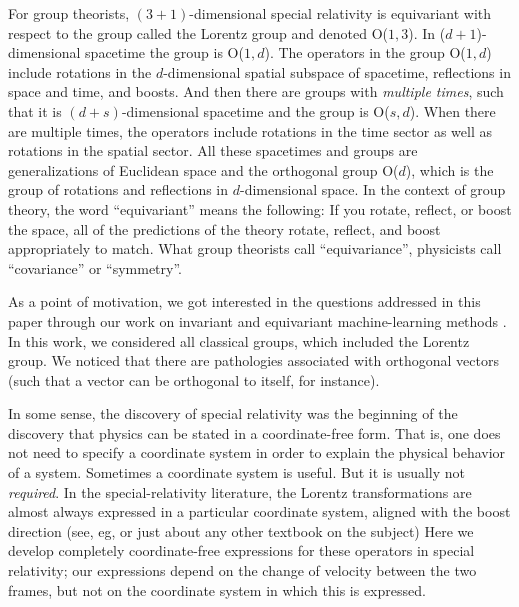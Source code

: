 \documentclass{article}
\newcommand{\plus}{\!+\!} %
\begin{document}
For group theorists, $(3\plus1)$-dimensional special relativity is equivariant with respect to the group called the Lorentz group and denoted O($1,3$).
In ($d\plus1$)-dimensional spacetime the group is O($1,d$).
The operators in the group O($1,d$) include rotations in the $d$-dimensional spatial subspace of spacetime, reflections in space and time, and boosts.
And then there are groups with \emph{multiple times}, such that it is $(d\plus s)$-dimensional spacetime and the group is O($s,d$).
When there are multiple times, the operators include rotations in the time sector as well as rotations in the spatial sector.
All these spacetimes and groups are generalizations of Euclidean space and the orthogonal group O($d$), which is the group of rotations and reflections in $d$-dimensional space.
In the context of group theory, the word ``equivariant'' means the following:
If you rotate, reflect, or boost the space, all of the predictions of the theory rotate, reflect, and boost appropriately to match.
What group theorists call ``equivariance'', physicists call ``covariance'' or ``symmetry''.

As a point of motivation, we got interested in the questions addressed in this paper through our work on invariant and equivariant machine-learning methods \cite{scalars}.
In this work, we considered all classical groups, which included the Lorentz group.
We noticed that there are pathologies associated with orthogonal vectors (such that a vector can be orthogonal to itself, for instance).

In some sense, the discovery of special relativity was the beginning of the discovery that physics can be stated in a coordinate-free form.
That is, one does not need to specify a coordinate system in order to explain the physical behavior of a system.
Sometimes a coordinate system is useful.
But it is usually not \emph{required}.
In the special-relativity literature, the Lorentz transformations are almost always expressed in a particular coordinate system, aligned with the boost direction (see, eg, \cite{french, zakamska} or just about any other textbook on the subject)
Here we develop completely coordinate-free expressions for these operators in special relativity; our expressions depend on the change of velocity between the two frames, but not on the coordinate system in which this is expressed.
\end{document}
